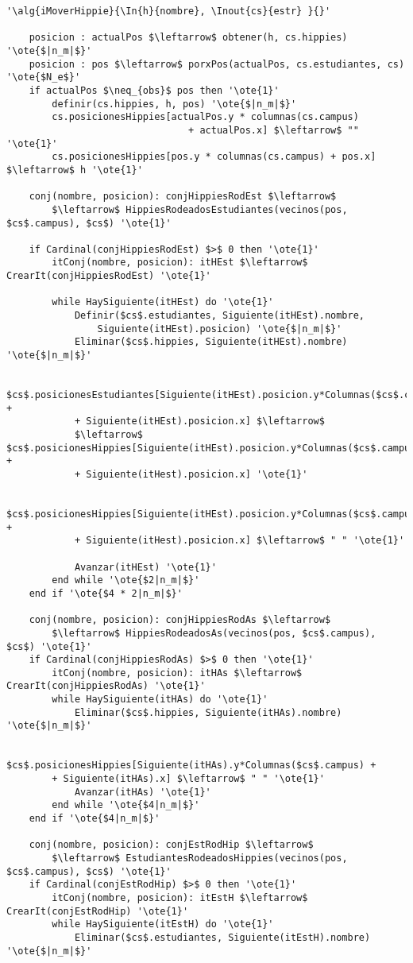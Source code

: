 \begin{lstlisting}[mathescape]
'\alg{iMoverHippie}{\In{h}{nombre}, \Inout{cs}{estr} }{}'

	posicion : actualPos $\leftarrow$ obtener(h, cs.hippies) '\ote{$|n_m|$}'
	posicion : pos $\leftarrow$ porxPos(actualPos, cs.estudiantes, cs) '\ote{$N_e$}'
	if actualPos $\neq_{obs}$ pos then '\ote{1}'
		definir(cs.hippies, h, pos) '\ote{$|n_m|$}'
		cs.posicionesHippies[actualPos.y * columnas(cs.campus)
								+ actualPos.x] $\leftarrow$ "" '\ote{1}'
		cs.posicionesHippies[pos.y * columnas(cs.campus) + pos.x] $\leftarrow$ h '\ote{1}'

	conj(nombre, posicion): conjHippiesRodEst $\leftarrow$
		$\leftarrow$ HippiesRodeadosEstudiantes(vecinos(pos, $cs$.campus), $cs$) '\ote{1}'

	if Cardinal(conjHippiesRodEst) $>$ 0 then '\ote{1}'
		itConj(nombre, posicion): itHEst $\leftarrow$ CrearIt(conjHippiesRodEst) '\ote{1}'

		while HaySiguiente(itHEst) do '\ote{1}'
			Definir($cs$.estudiantes, Siguiente(itHEst).nombre,
				Siguiente(itHEst).posicion) '\ote{$|n_m|$}'
			Eliminar($cs$.hippies, Siguiente(itHEst).nombre) '\ote{$|n_m|$}'

			$cs$.posicionesEstudiantes[Siguiente(itHEst).posicion.y*Columnas($cs$.campus) +
			+ Siguiente(itHEst).posicion.x] $\leftarrow$
			$\leftarrow$ $cs$.posicionesHippies[Siguiente(itHEst).posicion.y*Columnas($cs$.campus) +
			+ Siguiente(itHest).posicion.x] '\ote{1}'

			$cs$.posicionesHippies[Siguiente(itHEst).posicion.y*Columnas($cs$.campus) +
			+ Siguiente(itHest).posicion.x] $\leftarrow$ " " '\ote{1}'

			Avanzar(itHEst) '\ote{1}'
		end while '\ote{$2|n_m|$}'
	end if '\ote{$4 * 2|n_m|$}'

	conj(nombre, posicion): conjHippiesRodAs $\leftarrow$
		$\leftarrow$ HippiesRodeadosAs(vecinos(pos, $cs$.campus), $cs$) '\ote{1}'
	if Cardinal(conjHippiesRodAs) $>$ 0 then '\ote{1}'
		itConj(nombre, posicion): itHAs $\leftarrow$ CrearIt(conjHippiesRodAs) '\ote{1}'
		while HaySiguiente(itHAs) do '\ote{1}'
			Eliminar($cs$.hippies, Siguiente(itHAs).nombre) '\ote{$|n_m|$}'

			$cs$.posicionesHippies[Siguiente(itHAs).y*Columnas($cs$.campus) +
		+ Siguiente(itHAs).x] $\leftarrow$ " " '\ote{1}'
			Avanzar(itHAs) '\ote{1}'
		end while '\ote{$4|n_m|$}'
	end if '\ote{$4|n_m|$}'

	conj(nombre, posicion): conjEstRodHip $\leftarrow$
		$\leftarrow$ EstudiantesRodeadosHippies(vecinos(pos, $cs$.campus), $cs$) '\ote{1}'
	if Cardinal(conjEstRodHip) $>$ 0 then '\ote{1}'
		itConj(nombre, posicion): itEstH $\leftarrow$ CrearIt(conjEstRodHip) '\ote{1}'
		while HaySiguiente(itEstH) do '\ote{1}'
			Eliminar($cs$.estudiantes, Siguiente(itEstH).nombre) '\ote{$|n_m|$}'


\end{lstlisting}
